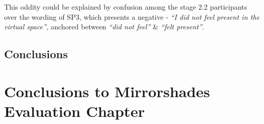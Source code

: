 This oddity could be explained by confusion among the stage 2.2 participants over the wording of SP3, which presents a negative - \textit{``I did not feel present in the virtual space''}, anchored between \textit{``did not feel''} \& \textit{``felt present''}.



\subsection{Conclusions}


\section{Conclusions to Mirrorshades Evaluation Chapter}

